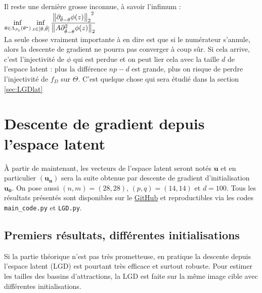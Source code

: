 \documentclass[hidelinks, french]{article} %
\renewcommand{\bf}[1]{\boldsymbol{#1}}
\theoremstyle{enonce}
\theoremstyle{special}
\theoremstyle{rq}
\theoremstyle{exo}
\theoremstyle{demo}
\begin{document}
Il reste une dernière grosse inconnue, à savoir l'infimum :\quad ${\displaystyle\inf_{\theta\in\Lambda_{\beta_1}(\theta^*)}\inf_{z\in[\theta,\Tilde{\theta}]}\frac{{\big\|\partial_{\Tilde{\theta}-\theta}\phi(z)\big\|_2}^2}{\big\|A\partial^2_{\Tilde{\theta}-\theta}\phi(z)\big\|_2}}$
\\
La seule chose vraiment importante à en dire est que si le numérateur s'annule, alors la descente de gradient ne pourra pas converger à coup sûr. Si cela arrive, c'est l'injectivité de $\phi$ qui est perdue et on peut lier cela avec la taille $d$ de l'espace latent : plus la différence $np-d$ est grande, plus on risque de perdre l'injectivité de $f_D$ sur $\Theta$. C'est quelque chose qui sera étudié dans la section \ref{sec:LGDlat}



\newpage



\section{Descente de gradient depuis l'espace latent}\label{sec:LBD}

\`A partir de maintenant, les vecteurs de l'espace latent seront notés $\bf{u}$ et en particulier $(\bf{u_n})$ sera la suite obtenue par descente de gradient d'initialisation $\bf{u_0}$. On pose aussi $(n,m)=(28,28)$, $(p,q)=(14,14)$ et $d=100$. Tous les résultats présentés sont disponibles sur le  \href{https://github.com/GregoireDoat/StageM1.git}{GitHub} et reproductibles via les codes \texttt{main\_code.py} et \texttt{LGD.py}.



\subsection{Premiers résultats, différentes initialisations}\label{sec:LDGinit}

Si la partie théorique n'est pas très prometteuse, en pratique la descente depuis l'espace latent (LGD) est pourtant très efficace et surtout robuste. Pour estimer les tailles des bassins d'attractions, la LGD est faite sur la même image cible avec différentes initialisations.
\end{document}
